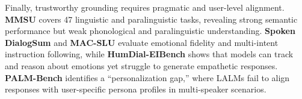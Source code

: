 Finally, trustworthy grounding requires pragmatic and user-level alignment. \textbf{MMSU} \cite{wang2025mmsu} covers 47 linguistic and paralinguistic tasks, revealing strong semantic performance but weak phonological and paralinguistic understanding. \textbf{Spoken DialogSum} \cite{lu2025spoken} and \textbf{MAC-SLU} \cite{peng2025mac} evaluate emotional fidelity and multi-intent instruction following, while \textbf{HumDial-EIBench} \cite{wang2026humdialeibenchhumanrecordedmultiturnemotional} shows that models can track and reason about emotions yet struggle to generate empathetic responses. \textbf{PALM-Bench} \cite{wang2026palm} identifies a ``personalization gap,'' where LALMs fail to align responses with user-specific persona profiles in multi-speaker scenarios.





